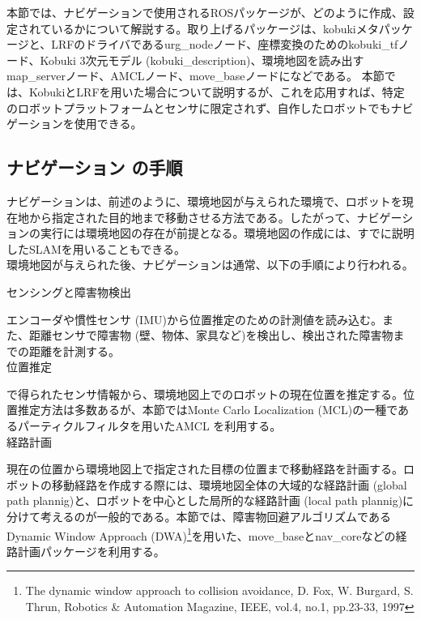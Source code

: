 本節では、ナビゲーションで使用されるROSパッケージが、どのように作成、設定されているかについて解説する。取り上げるパッケージは、kobukiメタパッケージと、LRFのドライバであるurg\_nodeノード、座標変換のためのkobuki\_tfノード、Kobuki 3次元モデル (kobuki\_description)、環境地図を読み出すmap\_serverノード、AMCLノード、move\_baseノードになどである。
本節では、KobukiとLRFを用いた場合について説明するが、これを応用すれば、特定のロボットプラットフォームとセンサに限定されず、自作したロボットでもナビゲーションを使用できる。

\subsection{ナビゲーション  の手順}

ナビゲーションは、前述のように、環境地図が与えられた環境で、ロボットを現在地から指定された目的地まで移動させる方法である。したがって、ナビゲーションの実行には環境地図の存在が前提となる。環境地図の作成には、すでに説明したSLAMを用いることもできる。\\

環境地図が与えられた後、ナビゲーションは通常、以下の手順により行われる。\\

\setcounter{num}{0}

\circled{\thenum} センシングと障害物検出

エンコーダや慣性センサ (IMU)から位置推定のための計測値を読み込む。また、距離センサで障害物 (壁、物体、家具など)を検出し、検出された障害物までの距離を計測する。\\

\circled{\thenum} 位置推定

 で得られたセンサ情報から、環境地図上でのロボットの現在位置を推定する。位置推定方法は多数あるが、本節ではMonte Carlo Localization (MCL)の一種であるパーティクルフィルタを用いたAMCL を利用する。\\

\circled{\thenum} 経路計画

現在の位置から環境地図上で指定された目標の位置まで移動経路を計画する。ロボットの移動経路を作成する際には、環境地図全体の大域的な経路計画 (global path plannig)と、ロボットを中心とした局所的な経路計画 (local path plannig)に分けて考えるのが一般的である。本節では、障害物回避アルゴリズムであるDynamic Window Approach (DWA)\footnote{The dynamic window approach to collision avoidance, D. Fox, W. Burgard, S. Thrun, Robotics \& Automation Magazine, IEEE, vol.4, no.1, pp.23-33, 1997}を用いた、move\_baseとnav\_coreなどの経路計画パッケージを利用する。\\


